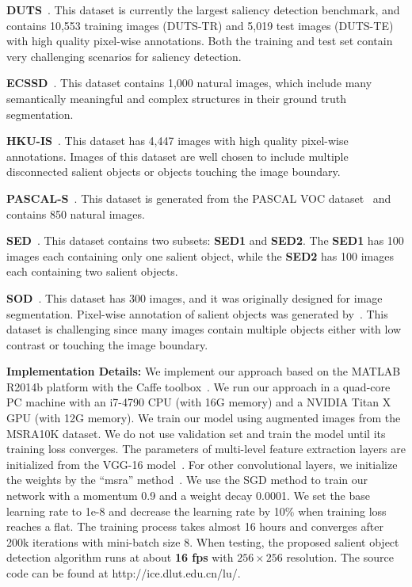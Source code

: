 \documentclass[10pt,twocolumn,letterpaper]{article}
\begin{document}
\textbf{DUTS}~\cite{zhao2015saliency}. This dataset is currently the largest saliency detection benchmark, and contains 10,553 training images (DUTS-TR) and 5,019 test images (DUTS-TE) with high quality pixel-wise annotations.
Both the training and test set contain very challenging scenarios for saliency detection.


\textbf{ECSSD}~\cite{yan2013hierarchical}. This dataset contains 1,000 natural images, which include many semantically meaningful and complex structures in their ground truth segmentation.

\textbf{HKU-IS}~\cite{zhao2015saliency}. This dataset has 4,447 images with high quality pixel-wise annotations.
Images of this dataset are well chosen to include multiple disconnected salient objects or objects touching the image boundary.

\textbf{PASCAL-S}~\cite{li2014secrets}. This dataset is generated from the PASCAL VOC dataset~\cite{Everingham2010ThePV} and contains 850 natural images.

\textbf{SED}~\cite{borj2015salient}. This dataset contains two subsets: \textbf{SED1} and \textbf{SED2}.
The \textbf{SED1} has 100 images each containing only one salient object, while the \textbf{SED2} has 100 images each containing two salient objects.

\textbf{SOD}~\cite{yan2013hierarchical}. This dataset has 300 images, and it was originally designed for image segmentation.
Pixel-wise annotation of salient objects was generated by~\cite{jiang2013salient}.
This dataset is challenging since many images contain multiple objects either with low contrast or touching the image boundary.

\textbf{Implementation Details:}
We implement our approach based on the MATLAB R2014b platform with the Caffe toolbox~\cite{jia2014caffe}.
We run our approach in a quad-core PC machine with an i7-4790 CPU (with 16G memory) and a NVIDIA Titan X GPU (with 12G memory).
We train our model using augmented images from the MSRA10K dataset. We do not use validation set and train the model
until its training loss converges.
The parameters of multi-level feature extraction layers are initialized from the VGG-16 model~\cite{simonyan2014very}.
For other convolutional layers, we initialize the weights by the ``msra'' method~\cite{He2015Delving}.
We use the SGD method to train our network with a momentum 0.9 and a weight decay 0.0001.
We set the base learning rate to 1e-8 and decrease the learning rate by 10\% when training loss reaches a flat.
The training process takes almost 16 hours and converges after 200k iterations with mini-batch size 8.
When testing, the proposed salient object detection algorithm runs at about \textbf{16 fps} with $256\times256$ resolution.
The source code can be found at \textcolor[rgb]{1,0,0}{http://ice.dlut.edu.cn/lu/}.
\end{document}
